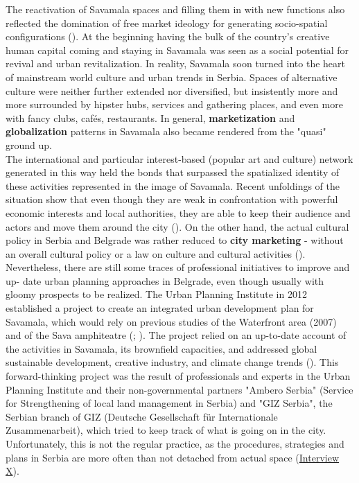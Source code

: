 \documentclass[11pt]{report}
\begin{document}
The reactivation of Savamala spaces and filling them in with new functions also reflected the domination of free market ideology for generating socio-spatial configurations (\href{ref}{\citealt{world_bank_cities_2000}}). 
At the beginning having the bulk of the country’s creative human capital coming and staying in Savamala was seen as a social potential for revival and urban revitalization. In reality, Savamala soon turned into the heart of mainstream world culture and urban trends in Serbia. Spaces of alternative culture were neither further extended nor diversified, but insistently more and more surrounded by hipster hubs, services and gathering places, and even more with fancy clubs, cafés, restaurants. In general, \textbf{marketization} and \textbf{globalization} patterns in Savamala also became rendered from the "quasi" ground up.
\\

The international and particular interest-based (popular art and culture) network generated in this way held the bonds that surpassed the spatialized identity of these activities represented in the image of Savamala. Recent unfoldings of the situation show that even though they are weak in confrontation with powerful economic interests and local authorities, they are able to keep their audience and actors and move them around the city  (\href{Dorcol}{\citealt{jovanovic_dorcol_2016}}).
On the other hand, the actual cultural policy in Serbia and Belgrade was rather reduced to \textbf{city marketing} - without an overall cultural policy or a law on culture and cultural activities (\href{ref}{\citealt{volic_belgrade_2012}}).
\\

Nevertheless, there are still some traces of professional initiatives to improve and up- date urban planning approaches in Belgrade, even though usually with gloomy prospects to be realized. The Urban Planning Institute in 2012 established a project to create an integrated urban development plan for Savamala, which would rely on previous studies of the Waterfront area (2007)
and of the Sava amphiteatre
(\href{Urban1}{\citealt{urbanisticki_zavod_beograda_program_2008}}; \href{Urban2}{\citealt{urbanisticki_zavod_beograda_program_2008-1}}).
The project relied on an up-to-date account of the activities in Savamala, its brownfield capacities, and addressed global sustainable development, creative industry, and climate change trends 
(\href{UZ}{\citealt{urbanisticki_zavod_beograda_integrated_2012}}).
This forward-thinking project was the result of professionals and experts in the Urban Planning Institute and their non-governmental partners "Ambero Serbia" (Service for Strengthening of local land management in Serbia) and "GIZ Serbia", the Serbian branch of GIZ (Deutsche Gesellschaft für Internationale Zusammenarbeit), which tried to keep track of what is going on in the city. Unfortunately, this is not the regular practice, as the procedures, strategies and plans in Serbia are more often than not detached from actual space 
(\href{InterviewX}{Interview X}).
\\
\end{document}
